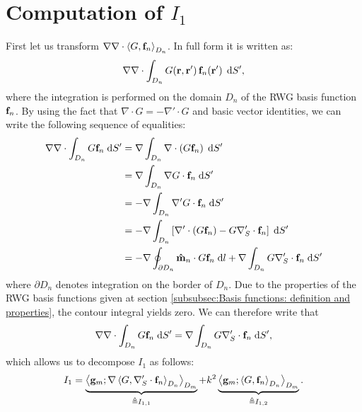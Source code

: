 \section{Computation of $I_1$}
%
\par
First let us transform $\nabla \nabla \cdot \left\langle G , \mathbf{f}_n \right\rangle_{D_n}$. In full form it is written as:
\begin{equation}
\nabla \nabla \cdot \int_{D_n} G\!\left(\mathbf{r},\mathbf{r}'\right) \mathbf{f}_n\!\left(\mathbf{r}'\right) \; \text{d} S',
\end{equation}
where the integration is performed on the domain $D_n$ of the RWG basis function $\mathbf{f}_n$. By using the fact that $\nabla \cdot G = -\nabla' \cdot G$ and basic vector identities, we can write the following sequence of equalities:
\begin{equation*}
\begin{split}
\nabla \nabla \cdot \int_{D_n} G \mathbf{f}_n \; \text{d} S' &= \nabla \int_{D_n} \nabla \cdot \left(G \mathbf{f}_n \right) \; \text{d} S' \\
&= \nabla \int_{D_n} \nabla G \cdot \mathbf{f}_n \; \text{d} S' \\
&= -\nabla \int_{D_n} \nabla' G \cdot \mathbf{f}_n \; \text{d} S' \\
&= -\nabla \int_{D_n} \left[\nabla' \cdot \left(G \mathbf{f}_n \right) - G \nabla_S^\prime \cdot \mathbf{f}_n\right]\; \text{d} S'\\
&= -\nabla \oint_{\partial D_n} \mathbf{\Hat{m}}_n \cdot G \mathbf{f}_n \; \text{d} l + \nabla \int_{D_n} G \nabla_S^\prime \cdot \mathbf{f}_n  \; \text{d} S'
\end{split}
\end{equation*}
where $\partial D_n$ denotes integration on the border of $D_n$. Due to the properties of the RWG basis functions given at section \ref{subsubsec:Basis functions: definition and properties}, the contour integral yields zero. We can therefore write that 
\begin{equation}
\nabla \nabla \cdot \int_{D_n} G \mathbf{f}_n \; \text{d} S' = \nabla \int_{D_n} G \nabla_S^\prime \cdot \mathbf{f}_n  \; \text{d} S',
\end{equation}
which allows us to decompose $I_1$ as follows:
\begin{equation}
I_1 = \underbrace{\left\langle \mathbf{g}_m ; \nabla \left\langle G , \nabla_S^\prime \cdot \mathbf{f}_n \right\rangle_{D_n} \right\rangle_{D_m}}_{\triangleq I_{1,1}} + k^2\underbrace{\left\langle \mathbf{g}_m ; \left\langle G , \mathbf{f}_n \right\rangle_{D_n} \right\rangle_{D_m}}_{\triangleq I_{1,2}}.
\end{equation}

